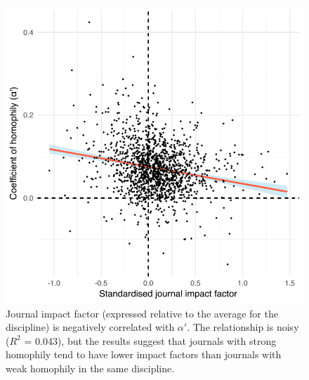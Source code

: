 \documentclass[12pt,]{article}
\begin{document}
\begin{figure}
\centering
\includegraphics{../figures/figure4.pdf}
\caption{Journal impact factor (expressed relative to the average for
the discipline) is negatively correlated with \(\alpha'\). The
relationship is noisy (\(R^2\) = 0.043), but the results suggest that
journals with strong homophily tend to have lower impact factors than
journals with weak homophily in the same discipline.
\label{impact_factor}}
\end{figure}
\end{document}

